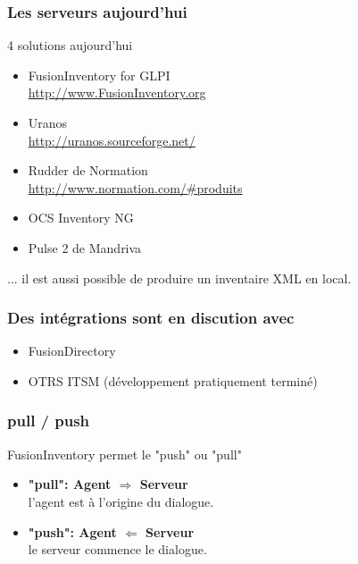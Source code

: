 \documentclass{beamer}
\begin{document}
\begin{frame}
    \frametitle{Les serveurs aujourd'hui}

    \begin{block}{4 solutions aujourd'hui}
        \begin{itemize}
            \item FusionInventory for GLPI \\
            \url{http://www.FusionInventory.org}
            \item Uranos \\
            \url{http://uranos.sourceforge.net/}
            \item Rudder de Normation \\
            \url{http://www.normation.com/\#produits}
            \item OCS Inventory NG
            \item Pulse 2 de Mandriva

        \end{itemize}
        ... il est aussi possible de produire un inventaire XML en local.
    \end{block}

\end{frame}

\begin{frame}
    \frametitle{Des intégrations sont en discution avec}

    \begin{itemize}
    \item FusionDirectory
    \item OTRS ITSM (développement pratiquement terminé)
    \end{itemize}
\end{frame}

\begin{frame}
    \frametitle{pull / push}

    \begin{block}{FusionInventory permet le "push" ou "pull"}
    \begin{itemize}
    \item \textbf{"pull": Agent $\Longrightarrow$ Serveur} \\
    l'agent est à l'origine du dialogue.
    \item \textbf{"push": Agent $\Longleftarrow$ Serveur} \\
    le serveur commence le dialogue.
    \end{itemize}
    \end{block}

\end{frame}
\end{document}
